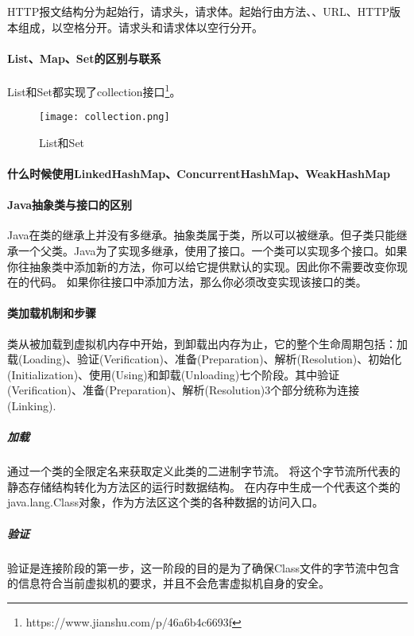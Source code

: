 \documentclass[../../../interview-questions.tex]{subfiles}
\begin{document}
HTTP报文结构分为起始行，请求头，请求体。起始行由方法、、URL、HTTP版本组成，以空格分开。请求头和请求体以空行分开。


\paragraph{List、Map、Set的区别与联系}

List和Set都实现了collection接口\footnote{https://www.jianshu.com/p/46a6b4c6693f}。

\begin{figure}[htbp]
	\centering
	\texttt{[image: collection.png]}
	\caption{List和Set}
	\label{fig:collection}
\end{figure}

\paragraph{什么时候使用LinkedHashMap、ConcurrentHashMap、WeakHashMap}

\paragraph{Java抽象类与接口的区别}

Java在类的继承上并没有多继承。抽象类属于类，所以可以被继承。但子类只能继承一个父类。Java为了实现多继承，使用了接口。一个类可以实现多个接口。如果你往抽象类中添加新的方法，你可以给它提供默认的实现。因此你不需要改变你现在的代码。 如果你往接口中添加方法，那么你必须改变实现该接口的类。

\paragraph{类加载机制和步骤}

 类从被加载到虚拟机内存中开始，到卸载出内存为止，它的整个生命周期包括：加载(Loading)、验证(Verification)、准备(Preparation)、解析(Resolution)、初始化(Initialization)、使用(Using)和卸载(Unloading)七个阶段。其中验证(Verification)、准备(Preparation)、解析(Resolution)3个部分统称为连接(Linking).

\subparagraph{加载}通过一个类的全限定名来获取定义此类的二进制字节流。
将这个字节流所代表的静态存储结构转化为方法区的运行时数据结构。
在内存中生成一个代表这个类的java.lang.Class对象，作为方法区这个类的各种数据的访问入口。

\subparagraph{验证}验证是连接阶段的第一步，这一阶段的目的是为了确保Class文件的字节流中包含的信息符合当前虚拟机的要求，并且不会危害虚拟机自身的安全。
\end{document}
